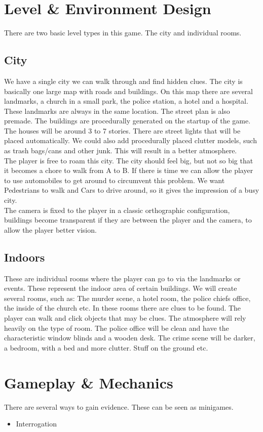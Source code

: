 \documentclass{article}
\begin{document}
\section{Level \& Environment Design}
	There are two basic level types in this game. The city and individual rooms.
	\subsection{City}
		We have a single city we can walk through and find hidden clues. The city is basically one large map with roads and buildings. On this map there are several landmarks, a church in a small park, the police station, a hotel and a hospital. These landmarks are always in the same location. The street plan is also premade. The buildings are procedurally generated on the startup of the game. The houses will be around 3 to 7 stories. There are street lights that will be placed automatically. We could also add procedurally placed clutter models, such as trash bags/cans and other junk. This will result in a better atmosphere.\\
		The player is free to roam this city. The city should feel big, but not so big that it becomes a chore to walk from A to B. If there is time we can allow the player to use automobiles to get around to circumvent this problem. We want Pedestrians to walk and Cars to drive around, so it gives the impression of a busy city.\\
		The camera is fixed to the player in a classic orthographic configuration, buildings become transparent if they are between the player and the camera, to allow the player better vision.
	\subsection{Indoors}
		These are individual rooms where the player can go to via the landmarks or events. These represent the indoor area of certain buildings. We will create several rooms, such as: The murder scene, a hotel room, the police chiefs office, the inside of the church etc. In these rooms there are clues to be found. The player can walk and click objects that may be clues. The atmosphere will rely heavily on the type of room. The police office will be clean and have the characteristic window blinds and a wooden desk. The crime scene will be darker, a bedroom, with a bed and more clutter. Stuff on the ground etc.

\section{Gameplay \& Mechanics}
		There are several ways to gain evidence. These can be seen as minigames.
		\begin{itemize}
			\item Interrogation
		\end{itemize}
\end{document}

